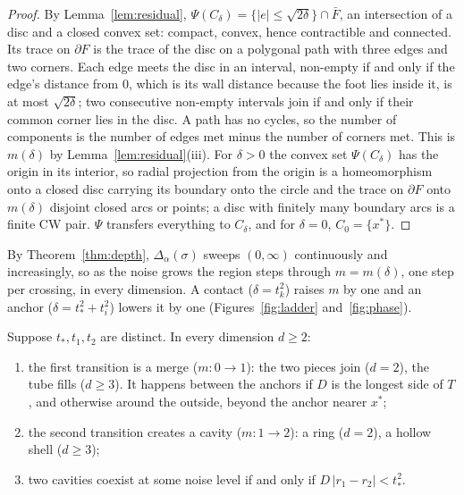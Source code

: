 \begin{proof}
By Lemma~\ref{lem:residual}, $\Psi(C_\delta) = \{|e| \le \sqrt{2\delta}\} \cap \bar F$, an intersection of a disc and a closed
convex set: compact, convex, hence contractible and connected. Its trace on $\partial F$ is the trace of the disc on a
polygonal path with three edges and two corners. Each edge meets the disc in an interval, non-empty if and only if the
edge's distance from $0$, which is its wall distance because the foot lies inside it, is at most $\sqrt{2\delta}$; two
consecutive non-empty intervals join if and only if their common corner lies in the disc. A path has no cycles, so the
number of components is the number of edges met minus the number of corners met. This is $m(\delta)$ by
Lemma~\ref{lem:residual}(iii). For $\delta > 0$ the convex set $\Psi(C_\delta)$ has the origin in its interior, so radial
projection from the origin is a homeomorphism onto a closed disc carrying its boundary onto the circle and the trace on
$\partial F$ onto $m(\delta)$ disjoint closed arcs or points; a disc with finitely many boundary arcs is a finite CW pair.
$\Psi$ transfers everything to $C_\delta$, and for $\delta = 0$, $C_0 = \{x^*\}$.
\end{proof}

By Theorem~\ref{thm:depth}, $\Delta_\alpha(\sigma)$ sweeps $(0, \infty)$ continuously and increasingly, so as the noise
grows the region steps through $m = m(\delta)$, one step per crossing, in every dimension. A contact ($\delta = t_k^2$)
raises $m$ by one and an anchor ($\delta = t_*^2 + t_i^2$) lowers it by one (Figures~\ref{fig:ladder}
and~\ref{fig:phase}).

\begin{corollary}\label{cor:first}
Suppose $t_*, t_1, t_2$ are distinct. In every dimension $d \ge 2$:
\begin{enumerate}[label=(\roman*)]
\item the first transition is a merge ($m: 0 \to 1$): the two pieces join ($d = 2$), the tube fills ($d \ge 3$). It
happens between the anchors if $D$ is the longest side of $T$, and otherwise around the outside, beyond the anchor
nearer $x^*$;
\item the second transition creates a cavity ($m: 1 \to 2$): a ring ($d = 2$), a hollow shell ($d \ge 3$);
\item two cavities coexist at some noise level if and only if $D\,|r_1 - r_2| < t_*^2$.
\end{enumerate}
\end{corollary}

